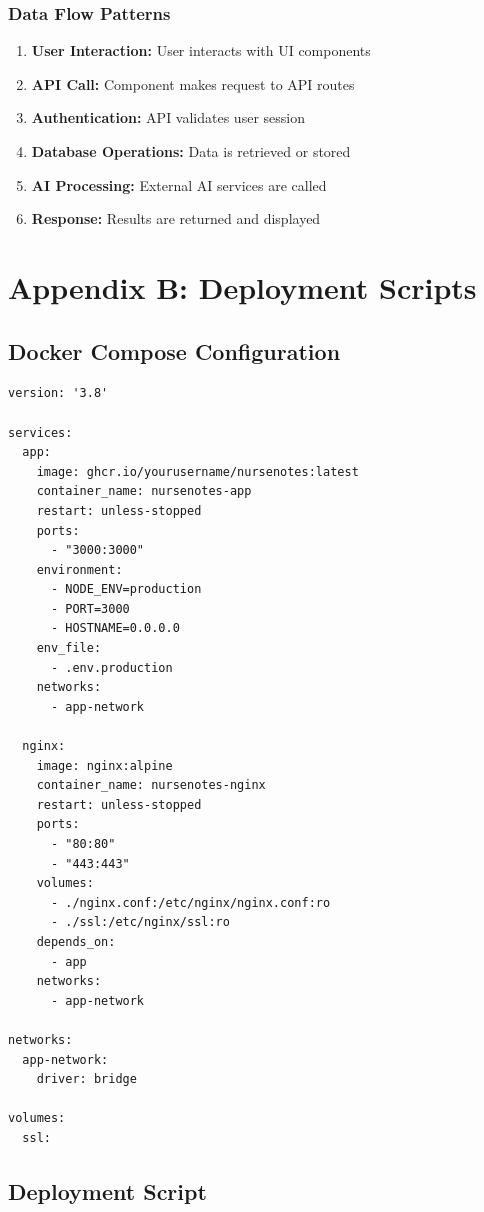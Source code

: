 \documentclass[12pt,a4paper]{article}
\begin{document}
\subsubsection{Data Flow Patterns}

\begin{enumerate}
    \item \textbf{User Interaction:} User interacts with UI components
    \item \textbf{API Call:} Component makes request to API routes
    \item \textbf{Authentication:} API validates user session
    \item \textbf{Database Operations:} Data is retrieved or stored
    \item \textbf{AI Processing:} External AI services are called
    \item \textbf{Response:} Results are returned and displayed
\end{enumerate}

\section{Appendix B: Deployment Scripts}

\subsection{Docker Compose Configuration}

\begin{lstlisting}[caption=Docker Compose for Production]
version: '3.8'

services:
  app:
    image: ghcr.io/yourusername/nursenotes:latest
    container_name: nursenotes-app
    restart: unless-stopped
    ports:
      - "3000:3000"
    environment:
      - NODE_ENV=production
      - PORT=3000
      - HOSTNAME=0.0.0.0
    env_file:
      - .env.production
    networks:
      - app-network

  nginx:
    image: nginx:alpine
    container_name: nursenotes-nginx
    restart: unless-stopped
    ports:
      - "80:80"
      - "443:443"
    volumes:
      - ./nginx.conf:/etc/nginx/nginx.conf:ro
      - ./ssl:/etc/nginx/ssl:ro
    depends_on:
      - app
    networks:
      - app-network

networks:
  app-network:
    driver: bridge

volumes:
  ssl:
\end{lstlisting}

\subsection{Deployment Script}
\end{document}
